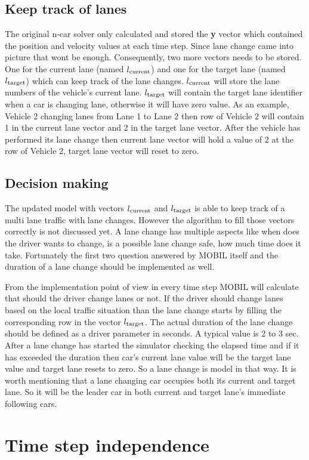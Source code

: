 		\subsection*{Keep track of lanes}
		The original n-car solver only calculated and stored the \textbf{y} vector which contained the position and velocity values at each time step. Since lane change came into picture that wont be enough. Consequently, two more vectors needs to be stored. One for the current lane (named $l_{\rm current}$) and one for the target lane (named $l_{\rm target}$) which can keep track of the lane changes. $l_{\rm current}$ will store the lane numbers of the vehicle's current lane. $l_{\rm target}$ will contain the target lane identifier when a car is changing lane, otherwise it will have zero value. As an example, Vehicle 2 changing lanes from Lane 1 to Lane 2 then row of Vehicle 2 will contain 1 in the current lane vector and 2 in the target lane vector. After the vehicle has performed its lane change then current lane vector will hold a value of 2 at the row of Vehicle 2, target lane vector will reset to zero.
		\subsection*{Decision making}
		The updated model with vectors $l_{\rm current}$ and $l_{\rm target}$ is able to keep track of a multi lane traffic with lane changes. However the algorithm to fill those vectors correctly is not discussed yet. A lane change has multiple aspects like when does the driver wants to change, is a possible lane change safe, how much time does it take. Fortunately the first two question answered by MOBIL itself and the duration of a lane change should be implemented as well.

		From the implementation point of view in every time step MOBIL will calculate that should the driver change lanes or not. If the driver should change lanes based on the local traffic situation than the lane change starts by filling the corresponding row in the vector $l_{\rm target}$. The actual duration of the lane change should be defined as a driver parameter in seconds. A typical value is 2 to 3 sec. After a lane change has started the simulator checking the elapsed time and if it has exceeded the duration then car's current lane value will be the target lane value and target lane resets to zero. So a lane change is model in that way. It is worth mentioning that a lane changing car occupies both its current and target lane. So it will be the leader car in both current and target lane's immediate following cars.
	\section{Time step independence}